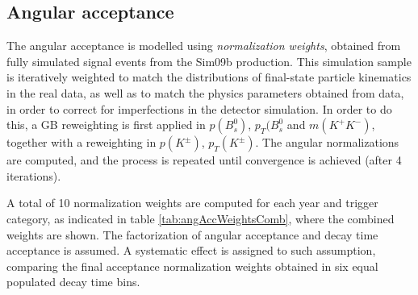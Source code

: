 
\subsection{Angular acceptance}
\label{subsec:AngAcc}
The angular acceptance is modelled using \textit{normalization weights},  obtained from fully simulated signal events from the Sim09b production. This simulation sample is iteratively weighted to match the distributions of final-state particle kinematics in the real data, as well as to match the physics parameters obtained from data, in order to correct for imperfections in the detector simulation. In order to do this, a GB reweighting is first applied in $p(B_s^0)$, $p_T(B_s^0$ and $m(K^+K^-)$, together with a reweighting in $p(K^{\pm})$, $p_T(K^{\pm})$. The angular normalizations are computed, and the process is repeated until convergence is achieved (after 4 iterations).  

A total of 10 normalization weights are computed for each year and trigger category, as indicated in table \ref{tab:angAccWeightsComb}, where the combined weights are shown. The factorization of angular acceptance and decay time acceptance is assumed. A systematic effect is assigned to such assumption, comparing the final acceptance normalization weights obtained in six equal populated decay time bins.

